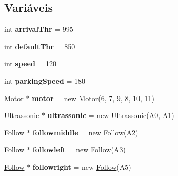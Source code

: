 \subsection*{Variáveis}
\begin{DoxyCompactItemize}
\item 
\mbox{\label{parking-solution_8ino_aa85fb31c2a5bce22940ba03366a50ab3}} 
int {\bfseries arrival\+Thr} = 995
\item 
\mbox{\label{parking-solution_8ino_aa5ec0bd88a5394de7d097d530c35c32c}} 
int {\bfseries default\+Thr} = 850
\item 
\mbox{\label{parking-solution_8ino_a218b4f7c6cc2681a99c23a3b089d68b1}} 
int {\bfseries speed} = 120
\item 
\mbox{\label{parking-solution_8ino_aa7b7134b6a2eb8f7c4db6eb16b2dfc7c}} 
int {\bfseries parking\+Speed} = 180
\item 
\mbox{\label{parking-solution_8ino_aa8a1e82701eb2e381658ab63b26b9e30}} 
\mbox{\hyperlink{class_motor}{Motor}} $\ast$ {\bfseries motor} = new \mbox{\hyperlink{class_motor}{Motor}}(6, 7, 9, 8, 10, 11)
\item 
\mbox{\label{parking-solution_8ino_a38da3453ce0afdded979e2c2161c51de}} 
\mbox{\hyperlink{class_ultrassonic}{Ultrassonic}} $\ast$ {\bfseries ultrassonic} = new \mbox{\hyperlink{class_ultrassonic}{Ultrassonic}}(A0, A1)
\item 
\mbox{\label{parking-solution_8ino_a73ef847c074d2baf460c59f251ffd3d4}} 
\mbox{\hyperlink{class_follow}{Follow}} $\ast$ {\bfseries followmiddle} = new \mbox{\hyperlink{class_follow}{Follow}}(A2)
\item 
\mbox{\label{parking-solution_8ino_a046cfba371102afa4af12b8518dbb054}} 
\mbox{\hyperlink{class_follow}{Follow}} $\ast$ {\bfseries followleft} = new \mbox{\hyperlink{class_follow}{Follow}}(A3)
\item 
\mbox{\label{parking-solution_8ino_a469ba30678c24ff29c0312b8f1b86d57}} 
\mbox{\hyperlink{class_follow}{Follow}} $\ast$ {\bfseries followright} = new \mbox{\hyperlink{class_follow}{Follow}}(A5)

\end{DoxyCompactItemize}
